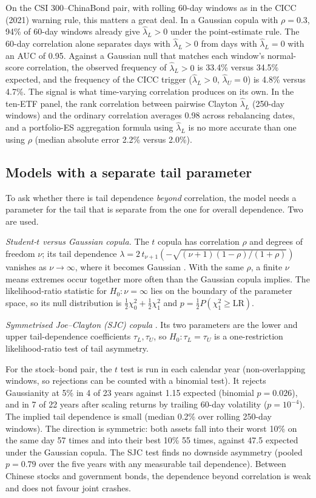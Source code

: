 \documentclass[11pt]{article}
\newcommand{\1}{\mathbf{1}}
\begin{document}
On the CSI 300--ChinaBond pair, with rolling 60-day windows as in the CICC (2021) warning rule, this matters a
great deal. In a Gaussian copula with $\rho=0.3$, 94\% of 60-day windows already give $\hat\lambda_L>0$ under
the point-estimate rule. The 60-day correlation alone separates days with $\hat\lambda_L>0$ from days with
$\hat\lambda_L=0$ with an AUC of 0.95. Against a Gaussian null that matches each window's normal-score
correlation, the observed frequency of $\hat\lambda_L>0$ is 33.4\% versus 34.5\% expected, and the frequency
of the CICC trigger ($\hat\lambda_L>0$, $\hat\lambda_U=0$) is 4.8\% versus 4.7\%. The signal is what
time-varying correlation produces on its own. In the ten-ETF panel, the rank correlation between pairwise
Clayton $\hat\lambda_L$ (250-day windows) and the ordinary correlation averages 0.98 across rebalancing dates,
and a portfolio-ES aggregation formula using $\hat\lambda_L$ is no more accurate than one using $\rho$
(median absolute error 2.2\% versus 2.0\%).

\subsection{Models with a separate tail parameter}

To ask whether there is tail dependence \emph{beyond} correlation, the model needs a parameter for the tail
that is separate from the one for overall dependence. Two are used.

\emph{Student-$t$ versus Gaussian copula.} The $t$ copula has correlation $\rho$ and degrees of freedom $\nu$;
its tail dependence $\lambda = 2\,t_{\nu+1}\!\left(-\sqrt{(\nu+1)(1-\rho)/(1+\rho)}\right)$ vanishes as
$\nu\to\infty$, where it becomes Gaussian \citep{demarta2005}. With the same $\rho$, a finite $\nu$ means extremes
occur together more often than the Gaussian copula implies. The likelihood-ratio statistic for $H_0:\nu=\infty$
lies on the boundary of the parameter space, so its null distribution is
$\tfrac12\chi^2_0+\tfrac12\chi^2_1$ and $p=\tfrac12 P(\chi^2_1\ge \mathrm{LR})$.

\emph{Symmetrised Joe--Clayton (SJC) copula} \citep{patton2006}. Its two parameters are the lower and upper
tail-dependence coefficients $\tau_L,\tau_U$, so $H_0:\tau_L=\tau_U$ is a one-restriction likelihood-ratio
test of tail asymmetry.

For the stock--bond pair, the $t$ test is run in each calendar year (non-overlapping windows, so rejections
can be counted with a binomial test). It rejects Gaussianity at 5\% in 4 of 23 years against 1.15 expected
(binomial $p=0.026$), and in 7 of 22 years after scaling returns by trailing 60-day volatility ($p=10^{-4}$).
The implied tail dependence is small (median 0.2\% over rolling 250-day windows). The direction is symmetric:
both assets fall into their worst 10\% on the same day 57 times and into their best 10\% 55 times, against
47.5 expected under the Gaussian copula. The SJC test finds no downside asymmetry (pooled $p=0.79$ over the
five years with any measurable tail dependence). Between Chinese stocks and government bonds, the dependence
beyond correlation is weak and does not favour joint crashes.
\end{document}
